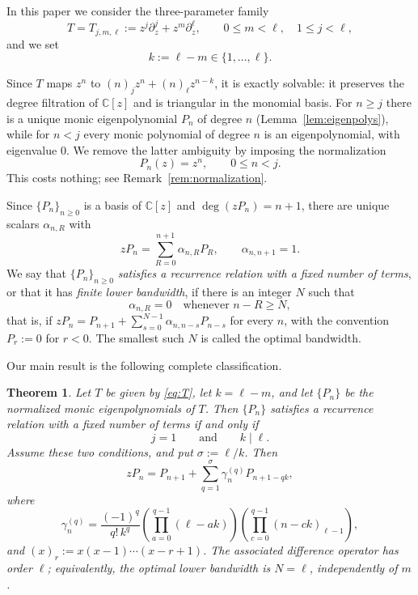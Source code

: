 \documentclass{amsart}
\newtheorem{theorem}{Theorem}[section]
\theoremstyle{definition}
\newcommand{\C}{\mathbb C}
\newcommand{\fall}[2]{(#1)_{#2}}
\begin{document}
In this paper we consider the three-parameter family
\begin{equation}\label{eq:T}
T=T_{j,m,\ell}:=z^j\partial_z^j+z^m\partial_z^\ell,
\qquad 0\le m<\ell,\quad 1\le j<\ell,
\end{equation}
and we set
\[
k:=\ell-m\in\{1,\dots,\ell\}.
\]

Since \(T\) maps \(z^n\) to \(\fall{n}{j}z^n+\fall{n}{\ell}z^{n-k}\), it is
exactly solvable: it preserves the degree filtration of \(\C[z]\) and is
triangular in the monomial basis.  For \(n\ge j\) there is a unique monic
eigenpolynomial \(P_n\) of degree \(n\) (Lemma~\ref{lem:eigenpolys}), while
for \(n<j\) every monic polynomial of degree \(n\) is an eigenpolynomial,
with eigenvalue \(0\).  We remove the latter ambiguity by imposing the
normalization
\begin{equation}\label{eq:normalization}
P_n(z)=z^n,\qquad 0\le n<j.
\end{equation}
This costs nothing; see Remark~\ref{rem:normalization}.

Since \(\{P_n\}_{n\ge0}\) is a basis of \(\C[z]\) and \(\deg(zP_n)=n+1\),
there are unique scalars \(\alpha_{n,R}\) with
\begin{equation}\label{eq:alpha-def}
zP_n=\sum_{R=0}^{n+1}\alpha_{n,R}P_R,
\qquad \alpha_{n,n+1}=1 .
\end{equation}
We say that \(\{P_n\}_{n\ge0}\) \emph{satisfies a recurrence relation with a
fixed number of terms}, or that it has \emph{finite lower bandwidth}, if
there is an integer \(N\) such that
\begin{equation}\label{eq:general-rec}
\alpha_{n,R}=0\quad\text{whenever } n-R\ge N,
\end{equation}
that is, if
\(
zP_n=P_{n+1}+\sum_{s=0}^{N-1}\alpha_{n,n-s}P_{n-s}
\)
for every \(n\), with the convention \(P_r:=0\) for \(r<0\).  The smallest
such \(N\) is called the optimal bandwidth.

Our main result is the following complete classification.

\begin{theorem}\label{thm:main}
Let \(T\) be given by \eqref{eq:T}, let \(k=\ell-m\), and let \(\{P_n\}\) be
the normalized monic eigenpolynomials of \(T\).  Then \(\{P_n\}\) satisfies a
recurrence relation with a fixed number of terms if and only if
\[
j=1
\qquad\text{and}\qquad
k\mid\ell .
\]
Assume these two conditions, and put \(\sigma:=\ell/k\).  Then
\begin{equation}\label{eq:main-rec}
zP_n=P_{n+1}+\sum_{q=1}^{\sigma}\gamma_n^{(q)}P_{n+1-qk},
\end{equation}
where
\begin{equation}\label{eq:main-gamma}
\gamma_n^{(q)}
=
\frac{(-1)^q}{q!\,k^q}
\left(\prod_{a=0}^{q-1}(\ell-ak)\right)
\left(\prod_{c=0}^{q-1}\fall{n-ck}{\ell-1}\right),
\end{equation}
and \(\fall{x}{r}:=x(x-1)\cdots(x-r+1)\).  The associated difference
operator has order \(\ell\); equivalently, the optimal lower bandwidth is
\(N=\ell\), independently of \(m\).
\end{theorem}
\end{document}
